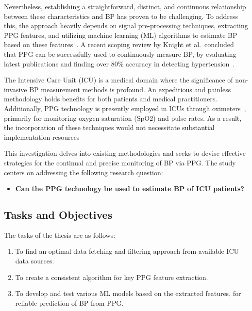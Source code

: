 Nevertheless, establishing a straightforward, distinct, and continuous relationship between these characteristics and BP has proven to be challenging.
To address this, the approach heavily depends on signal pre-processing techniques, extracting PPG features, and utilizing machine learning (ML) algorithms to estimate BP based on these features~\cite{el-hajjDeepLearningModels2021}.
A recent scoping review by Knight et al.\ concluded that PPG can be successfully used to continuously measure BP, by evaluating latest publications and finding over 80\% accuracy in detecting hypertension~\cite{knightAccuracyWearablePhotoplethysmography2022}.

The Intensive Care Unit (ICU) is a medical domain where the significance of non-invasive BP measurement methods is profound.
An expeditious and painless methodology holds benefits for both patients and medical practitioners.
Additionally, PPG technology is presently employed in ICUs through oximeters~\cite{aoyagiPulseOximetryIts2002}, primarily for monitoring oxygen saturation (SpO2) and pulse rates.
As a result, the incorporation of these techniques would not necessitate substantial implementation resources

\vspace{0.2cm}

This investigation delves into existing methodologies and seeks to devise effective strategies for the continual and precise monitoring of BP via PPG\@.
The study centers on addressing the following research question:

\begin{itemize}
    \item \textbf{Can the PPG technology be used to estimate BP of ICU patients?}
\end{itemize}

\subsection{Tasks and Objectives}
\label{subsec:tasks_objectives}

The tasks of the thesis are as follows:

\begin{enumerate}
    \item To find an optimal data fetching and filtering approach from available ICU data sources.
    \item To create a consistent algorithm for key PPG feature extraction.
    \item To develop and test various ML models based on the extracted features, for reliable prediction of BP from PPG\@.
\end{enumerate}

